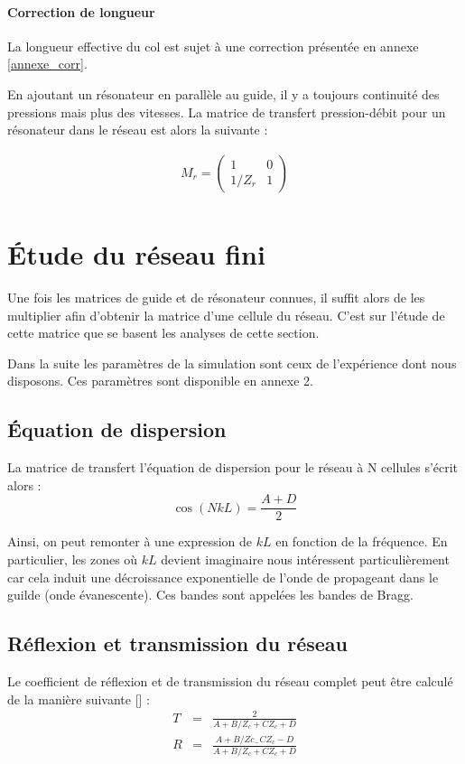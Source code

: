 \paragraph{Correction de longueur}
La longueur effective du col est sujet à une correction présentée en annexe \ref{annexe_corr}.

En ajoutant un résonateur en parallèle au guide, il y a toujours continuité des pressions mais plus des vitesses. La matrice de transfert pression-débit pour un résonateur dans le réseau est alors la suivante :

\begin{eqnarray*}
M_{r} = \begin{pmatrix} 1 &  0 \\ 1 /Z_{r} & 1  \end{pmatrix}\\
\end{eqnarray*}

\section{Étude du réseau fini}

Une fois les matrices de guide et de résonateur connues, il suffit alors de les multiplier afin d'obtenir la matrice d'une cellule du réseau. C'est sur l'étude de cette matrice que se basent les analyses de cette section. 

Dans la suite les paramètres de la simulation sont ceux de l'expérience dont nous disposons. Ces paramètres sont disponible en annexe 2.

\subsection{Équation de dispersion}
La matrice de transfert l'équation de dispersion pour le réseau à N cellules s'écrit alors : 
\begin{equation}
\cos(NkL) = \frac{A+D}{2} 
\end{equation}

Ainsi, on peut remonter à une expression de $kL$ en fonction de la fréquence. En particulier, les zones où $kL$ devient imaginaire nous intéressent particulièrement car cela induit une décroissance exponentielle de l'onde de propageant dans le guilde (onde évanescente). Ces bandes sont appelées les bandes de Bragg.

\subsection{Réflexion et transmission du réseau}
Le coefficient de réflexion et de transmission du réseau complet peut être calculé de la manière suivante [] : 
\begin{eqnarray}
T & = & \frac{2}{A + B/Z_c + C Z_c + D} \\
R & = & \frac{A + B / Zc_ - C Z_c -D}{A + B/Z_c + C Z_c + D} 
\end{eqnarray}

